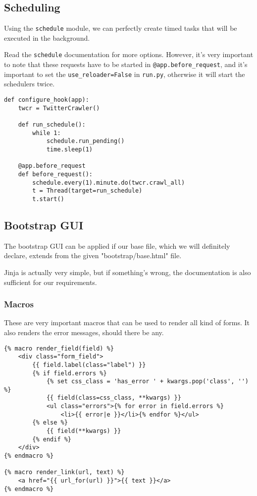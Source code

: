 \documentclass[../main/main.tex]{subfiles}
\begin{document}
\subsection{Scheduling}

Using the \lstinline|schedule| module, we can perfectly create timed tasks that
will be executed in the background. 

Read the \lstinline|schedule| documentation for more options. However, it's very
important to note that these requests have to be started in
\lstinline|@app.before_request|, and it's important to set the
\lstinline|use_reloader=False| in \lstinline|run.py|, otherwise it will start
the schedulers twice. 

\begin{lstlisting}
def configure_hook(app):
    twcr = TwitterCrawler()

    def run_schedule():
        while 1:
            schedule.run_pending()
            time.sleep(1)

    @app.before_request
    def before_request():
        schedule.every(1).minute.do(twcr.crawl_all)
        t = Thread(target=run_schedule)
        t.start()
\end{lstlisting}

\subsection{Bootstrap GUI}

The bootstrap GUI can be applied if our base file, which we will definitely
declare, extends from the given "bootstrap/base.html" file. 

Jinja is actually very simple, but if something's wrong, the documentation is
also sufficient for our requirements.  

\subsubsection{Macros}

These are very important macros that can be used to render all kind of forms. It
also renders the error messages, should there be any. 

\begin{lstlisting}
{% macro render_field(field) %}
    <div class="form_field">
        {{ field.label(class="label") }}
        {% if field.errors %}
            {% set css_class = 'has_error ' + kwargs.pop('class', '') %}
            {{ field(class=css_class, **kwargs) }}
            <ul class="errors">{% for error in field.errors %}
                <li>{{ error|e }}</li>{% endfor %}</ul>
        {% else %}
            {{ field(**kwargs) }}
        {% endif %}
    </div>
{% endmacro %}

{% macro render_link(url, text) %}
    <a href="{{ url_for(url) }}">{{ text }}</a>
{% endmacro %}
\end{lstlisting}
\end{document}
